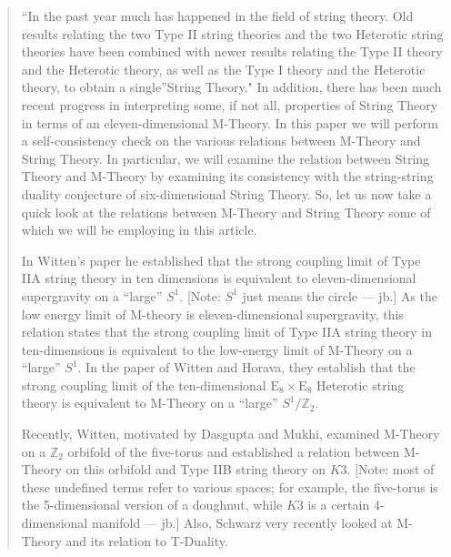 \documentclass{article}
\begin{document}
\begin{quote}
``In the past year much has happened in the field of string theory. Old
results relating the two Type II string theories and the two Heterotic
string theories have been combined with newer results relating the Type
II theory and the Heterotic theory, as well as the Type I theory and the
Heterotic theory, to obtain a single''String Theory." In addition, there
has been much recent progress in interpreting some, if not all,
properties of String Theory in terms of an eleven-dimensional M-Theory.
In this paper we will perform a self-consistency check on the various
relations between M-Theory and String Theory. In particular, we will
examine the relation between String Theory and M-Theory by examining its
consistency with the string-string duality conjecture of six-dimensional
String Theory. So, let us now take a quick look at the relations between
M-Theory and String Theory some of which we will be employing in this
article.

In Witten's paper he established that the strong coupling limit of Type
IIA string theory in ten dimensions is equivalent to eleven-dimensional
supergravity on a ``large'' \(S^1\). {[}Note: \(S^1\) just means the
circle --- jb.{]} As the low energy limit of M-theory is
eleven-dimensional supergravity, this relation states that the strong
coupling limit of Type IIA string theory in ten-dimensions is equivalent
to the low-energy limit of M-Theory on a ``large'' \(S^1\). In the paper
of Witten and Horava, they establish that the strong coupling limit of
the ten-dimensional \(\mathrm{E}_8 \times \mathrm{E}_8\) Heterotic
string theory is equivalent to M-Theory on a ``large''
\(S^1/\mathbb{Z}_2\).

Recently, Witten, motivated by Dasgupta and Mukhi, examined M-Theory on
a \(\mathbb{Z}_2\) orbifold of the five-torus and established a relation
between M-Theory on this orbifold and Type IIB string theory on \(K3\).
{[}Note: most of these undefined terms refer to various spaces; for
example, the five-torus is the 5-dimensional version of a doughnut,
while \(K3\) is a certain 4-dimensional manifold --- jb.{]} Also,
Schwarz very recently looked at M-Theory and its relation to T-Duality.


\end{quote}
\end{document}
